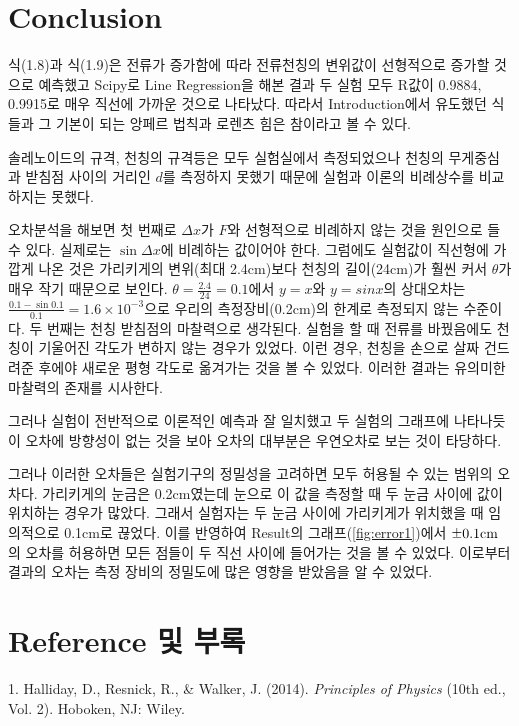 \documentclass[a4paper]{article}
\newcommand{\mypm}{\mathbin{\smash{%
\raisebox{0.35ex}{%
            $\underset{\raisebox{0.5ex}{$\smash -$}}{\smash+}$%
            }%
        }%
    }%
}
\begin{document}
	

\newpage




	\section{Conclusion}
	식(1.8)과 식(1.9)은 전류가 증가함에 따라 전류천칭의 변위값이 선형적으로 증가할 것으로 예측했고 Scipy로 Line Regression을 해본 결과 두 실험 모두 R값이 0.9884, 0.9915로 매우 직선에 가까운 것으로 나타났다.
	따라서 Introduction에서 유도했던 식들과 그 기본이 되는 앙페르 법칙과 로렌츠 힘은 참이라고 볼 수 있다. 

	솔레노이드의 규격, 천칭의 규격등은 모두 실험실에서 측정되었으나 천칭의 무게중심과 받침점 사이의 거리인 $d$를 측정하지 못했기 때문에 실험과 이론의 비례상수를 비교하지는 못했다. 

	오차분석을 해보면 첫 번째로 $\Delta{}x$가 $F$와 선형적으로 비례하지 않는 것을 원인으로 들 수 있다. 
	실제로는 $\sin{\Delta{}x}$에 비례하는 값이어야 한다.
	그럼에도 실험값이 직선형에 가깝게 나온 것은 가리키게의 변위(최대 2.4\si{cm})보다 천칭의 길이(24\si{cm})가 훨씬 커서 $\theta$가 매우 작기 때문으로 보인다.
	$\theta=\frac{2.4}{24}=0.1$에서 $y=x$와 $y=sinx$의 상대오차는 $\frac{0.1-\sin{0.1}}{0.1}=1.6 \times 10^{-3}$으로 우리의 측정장비(0.2\si{cm})의 한계로 측정되지 않는 수준이다. 
	두 번째는 천칭 받침점의 마찰력으로 생각된다.
	실험을 할 때 전류를 바꿨음에도 천칭이 기울어진 각도가 변하지 않는 경우가 있었다.
	이런 경우, 천칭을 손으로 살짜 건드려준 후에야 새로운 평형 각도로 옮겨가는 것을 볼 수 있었다.
	이러한 결과는 유의미한 마찰력의 존재를 시사한다.
	
	그러나 실험이 전반적으로 이론적인 예측과 잘 일치했고 두 실험의 그래프에 나타나듯이 오차에 방향성이 없는 것을 보아 오차의 대부분은 우연오차로 보는 것이 타당하다.
		
	그러나 이러한 오차들은 실험기구의 정밀성을 고려하면 모두 허용될 수 있는 범위의 오차다.
	가리키게의 눈금은 0.2\si{cm}였는데 눈으로 이 값을 측정할 때 두 눈금 사이에 값이 위치하는 경우가 많았다.
	그래서 실험자는 두 눈금 사이에 가리키게가 위치했을 때 임의적으로 0.1\si{cm}로 끊었다.
	이를 반영하여 Result의 그래프(\ref{fig:error1})에서 $\mypm{}0.1\si{cm}$의 오차를 허용하면 모든 점들이 두 직선 사이에 들어가는 것을 볼 수 있었다.
	이로부터 결과의 오차는 측정 장비의 정밀도에 많은 영향을 받았음을 알 수 있었다.




\section{Reference 및 부록}
	1. Halliday, D., Resnick, R., \& Walker, J. (2014). {\it{}Principles of Physics} (10th ed., Vol. 2). Hoboken, NJ: Wiley.
	\\ 
\end{document}

